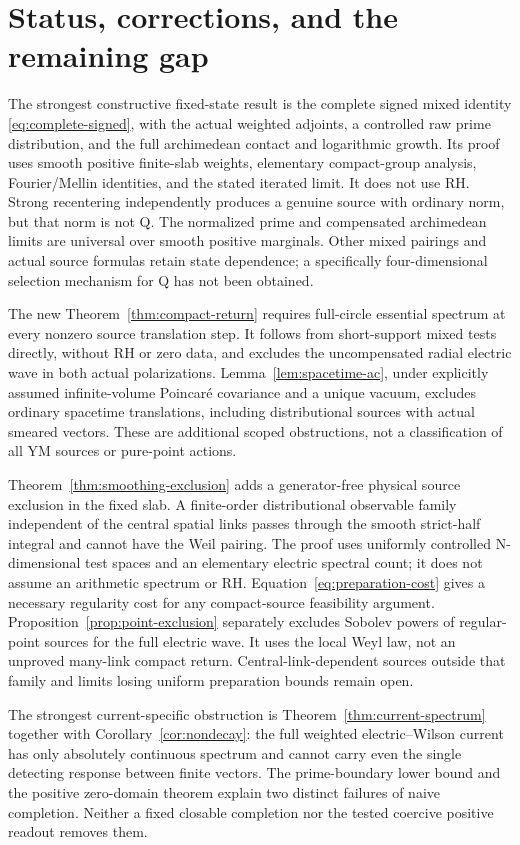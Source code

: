 \section{Status, corrections, and the remaining gap}\label{sec:status}
The strongest constructive fixed-state result is the
complete signed mixed identity \eqref{eq:complete-signed},
with the actual weighted adjoints, a controlled raw
prime distribution, and the full archimedean contact and
logarithmic growth. Its proof uses smooth positive
finite-slab weights, elementary compact-group analysis,
Fourier/Mellin identities, and the stated iterated limit.
It does not use RH. Strong recentering independently
produces a genuine source with ordinary \Ltwo{} norm, but
that norm is not Q.
The normalized prime and compensated archimedean limits are universal
over smooth positive marginals. Other mixed pairings and actual source
formulas retain state dependence; a specifically four-dimensional
selection mechanism for Q has not been obtained.

The new Theorem~\ref{thm:compact-return} requires full-circle essential
spectrum at every nonzero source translation step. It follows from
short-support mixed tests directly, without RH or zero data, and excludes
the uncompensated radial electric wave in both actual polarizations.
Lemma~\ref{lem:spacetime-ac}, under explicitly assumed infinite-volume
Poincar\'e covariance and a unique vacuum, excludes ordinary spacetime
translations, including distributional sources with actual smeared
vectors. These are additional scoped obstructions, not a classification
of all YM sources or pure-point actions.

Theorem~\ref{thm:smoothing-exclusion} adds a generator-free physical
source exclusion in the fixed slab. A finite-order distributional
observable family independent of the central spatial links passes
through the smooth strict-half integral and cannot have the Weil
pairing. The proof uses uniformly controlled N-dimensional test spaces
and an elementary electric spectral count; it does not assume an
arithmetic spectrum or RH. Equation~\eqref{eq:preparation-cost} gives
a necessary regularity cost for any compact-source feasibility argument.
Proposition~\ref{prop:point-exclusion} separately excludes Sobolev powers
of regular-point sources for the full electric wave. It uses the local
Weyl law, not an unproved many-link compact return. Central-link-dependent
sources outside that family and limits losing uniform preparation
bounds remain open.

The strongest current-specific obstruction is
Theorem~\ref{thm:current-spectrum} together with
Corollary~\ref{cor:nondecay}: the full weighted
electric--Wilson current has only absolutely continuous
spectrum and cannot carry even the single detecting
response between finite vectors. The prime-boundary
lower bound and the positive zero-domain theorem explain
two distinct failures of naive completion. Neither a
fixed closable \Ltwo{} completion nor the tested coercive
positive readout removes them.

